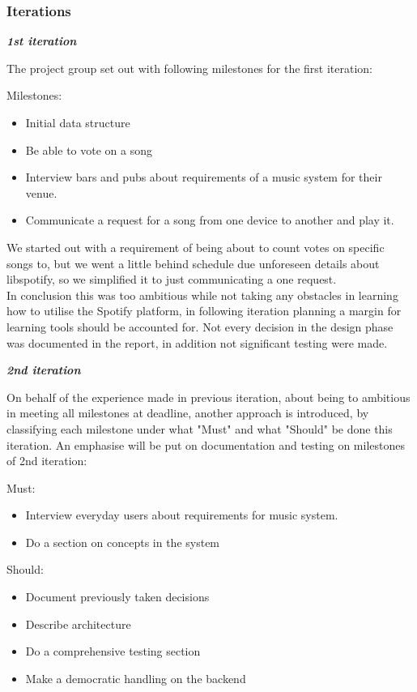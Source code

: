 \subsubsection{Iterations}
\textit{\textbf{1st iteration}}

	The project group set out with following milestones for the first iteration:

	Milestones:
	\begin{itemize}
		\item Initial data structure
		\item Be able to vote on a song
		\item Interview bars and pubs about requirements of a music system for their venue.
		\item Communicate a request for a song from one device to another and play it.
	\end{itemize}

	We started out with a requirement of being about to count votes on specific songs to, but we went a little behind schedule due unforeseen details about libspotify, so we simplified it to just communicating a one request.\\
	In conclusion this was too ambitious while not taking any obstacles in learning how to utilise the Spotify platform, in following iteration planning a margin for learning tools should be accounted for. Not every decision in the design phase was documented in the report, in addition not significant testing were made.

\noindent\textit{\textbf{2nd iteration}}

	On behalf of the experience made in previous iteration, about being to ambitious in meeting all milestones at deadline, another approach is introduced, by classifying each milestone under what "Must" and what "Should" be done this iteration. An emphasise will be put on documentation and testing on milestones of 2nd iteration:

	Must:
	\begin{itemize}
		\item Interview everyday users about requirements for music system.
		\item Do a section on concepts in the system
	\end{itemize}

	Should:
	\begin{itemize}
		\item Document previously taken decisions
		\item Describe architecture
		\item Do a comprehensive testing section
		\item Make a democratic handling on the backend
	\end{itemize}